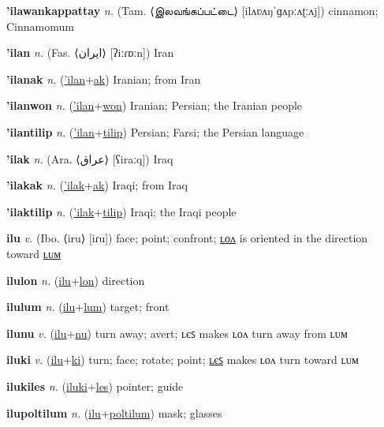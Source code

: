 \textbf{\hypertarget{'ilawankappattay}{'ilawankappattay}} \textit{n.} (Tam. ⟨{\tamil{}இலவங்கப்பட்டை}⟩ [ilʌʋʌŋˈɡʌpːʌʈːʌj])
cinnamon; Cinnamomum

\textbf{\hypertarget{'ilan}{'ilan}} \textit{n.} (Fas. ⟨{\arabics{}ایران‎}⟩ [ʔiːɾɒːn])
Iran

\textbf{\hypertarget{'ilanak}{'ilanak}} \textit{n.} (\hyperlink{'ilan}{'ilan}+\allowbreak \hyperlink{ak}{ak})
Iranian; from Iran

\textbf{\hypertarget{'ilanwon}{'ilanwon}} \textit{n.} (\hyperlink{'ilan}{'ilan}+\allowbreak \hyperlink{won}{won})
Iranian; Persian; the Iranian people

\textbf{\hypertarget{'ilantilip}{'ilantilip}} \textit{n.} (\hyperlink{'ilan}{'ilan}+\allowbreak \hyperlink{tilip}{tilip})
Persian; Farsi; the Persian language

\textbf{\hypertarget{'ilak}{'ilak}} \textit{n.} (Ara. ⟨{\arabics{}عراق}⟩ [ʕiraːq])
Iraq

\textbf{\hypertarget{'ilakak}{'ilakak}} \textit{n.} (\hyperlink{'ilak}{'ilak}+\allowbreak \hyperlink{ak}{ak})
Iraqi; from Iraq

\textbf{\hypertarget{'ilaktilip}{'ilaktilip}} \textit{n.} (\hyperlink{'ilak}{'ilak}+\allowbreak \hyperlink{tilip}{tilip})
Iraqi; the Iraqi people

\textbf{\hypertarget{ilu}{ilu}} \textit{v.} (Ibo. ⟨iru⟩ [iɾu])
face; point; confront; \hyperlink{ilulon}{ʟᴏᴧ} is oriented in the direction toward \hyperlink{ilulum}{ʟᴜᴍ}

\textbf{\hypertarget{ilulon}{ilulon}} \textit{n.} (\hyperlink{ilu}{ilu}+\allowbreak \hyperlink{lon}{lon})
direction

\textbf{\hypertarget{ilulum}{ilulum}} \textit{n.} (\hyperlink{ilu}{ilu}+\allowbreak \hyperlink{lum}{lum})
target; front

\textbf{\hypertarget{ilunu}{ilunu}} \textit{v.} (\hyperlink{ilu}{ilu}+\allowbreak \hyperlink{nu}{nu})
turn away; avert; ʟєꜱ makes ʟᴏᴧ turn away from ʟᴜᴍ

\textbf{\hypertarget{iluki}{iluki}} \textit{v.} (\hyperlink{ilu}{ilu}+\allowbreak \hyperlink{ki}{ki})
turn; face; rotate; point; \hyperlink{ilukiles}{ʟєꜱ} makes ʟᴏᴧ turn toward ʟᴜᴍ

\textbf{\hypertarget{ilukiles}{ilukiles}} \textit{n.} (\hyperlink{iluki}{iluki}+\allowbreak \hyperlink{les}{les})
pointer; guide

\textbf{\hypertarget{ilupoltilum}{ilupoltilum}} \textit{n.} (\hyperlink{ilu}{ilu}+\allowbreak \hyperlink{poltilum}{poltilum})
mask; glasses

